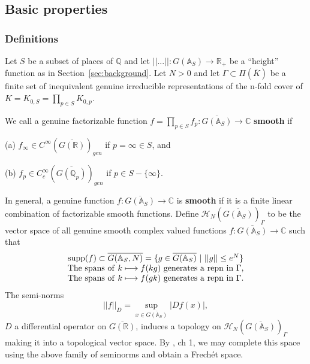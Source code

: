 \subsection{Basic properties}

\subsubsection{Definitions}\label{sssec:defs}

Let $S$ be a subset of places of ${\mathbb{Q}}$ and let
$||...||:G({\mathbb{A}}_S)\rightarrow {\mathbb{R}}_+$ be a ``height'' function
as in Section~\ref{sec:background}. Let $N>0$ and let
$\Gamma\subset \Pi(\overline{K})$
be a finite set of inequivalent genuine irreducible representations
of the n-fold cover of $K=K_{0,S}=\prod_{p\in S}K_{0,p}$.

We call a genuine factorizable function
$f=\prod_{p\in S}f_p:\overline{G({\mathbb{A}}_S)}\rightarrow {\mathbb{C}}$
{\bf smooth} if

(a) $f_\infty\in C^\infty(\overline{G({\mathbb{R}})})_{gen}$
if $p=\infty \in S$, and

(b) $f_p\in C_c^\infty(\overline{G({\mathbb{Q}}_p)})_{gen}$
if $p\in S-\{\infty\}$.

\noindent
In general, a genuine
function $f:\overline{G({\mathbb{A}}_S)}\rightarrow {\mathbb{C}}$
is {\bf smooth} if it is a finite linear combination of factorizable smooth
functions. Define
${\mathcal{H}}_N(\overline{G({\mathbb{A}}_S)})_\Gamma$
to be the vector space of
all genuine smooth complex valued functions
$f:\overline{G({\mathbb{A}}_S)}\rightarrow {\mathbb{C}}$
such that
\begin{equation}\label{eq:4.11}
\begin{array}{c}
{\rm supp}(f)\subset \overline{G({\mathbb{A}}_S,N)}
=\{ g\in \overline{G({\mathbb{A}}_S)}\ |\ ||g||\leq e^N\}\\
{\rm The \ spans\ of\ }
k\longmapsto f(kg){\rm \ generates\ a \ repn\ in\ }\Gamma,\\
{\rm The \ spans\ of\ }
k\longmapsto f(gk){\rm \ generates\ a \ repn\ in\ }\Gamma .
\end{array}
\end{equation}
The semi-norms
\[
||f||_D=\sup_{x\in \overline{G({\mathbb{A}}_S)}} |Df(x)|,
\]
$D$ a differential operator on $\overline{G({\mathbb{R}})}$,
induces a topology on
${\mathcal{H}}_N(\overline{G({\mathbb{A}}_S)})_\Gamma$
making it into a topological
vector space. By \cite{Ru}, ch 1,
we may complete this space using the above
family of seminorms and obtain a Frech\'et space.

